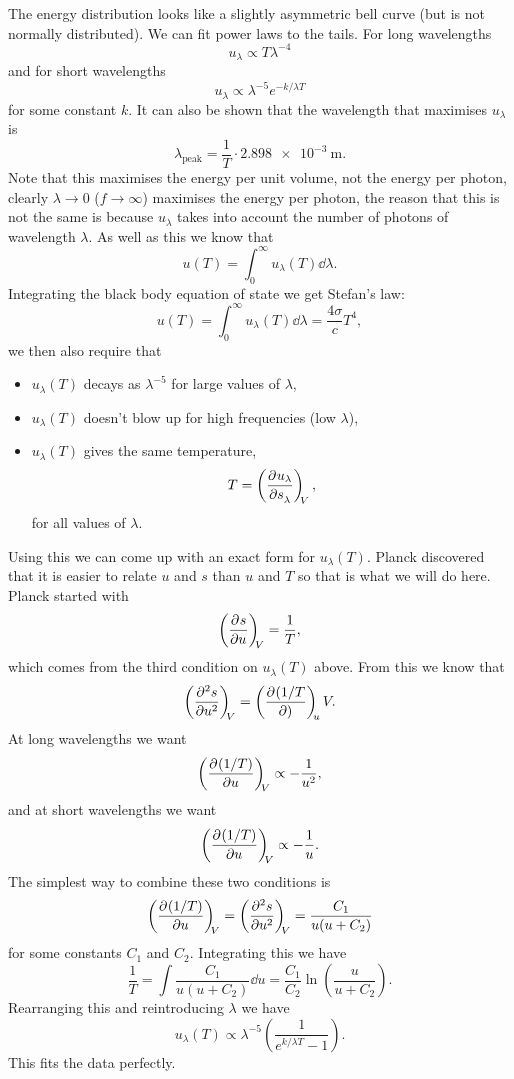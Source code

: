     The energy distribution looks like a slightly asymmetric bell curve (but is not normally distributed).
    We can fit power laws to the tails.
    For long wavelengths
    \[u_\lambda \propto T\lambda^{-4}\]
    and for short wavelengths
    \[u_\lambda \propto \lambda^{-5}e^{-k/\lambda T}\]
    for some constant \(k\).
    It can also be shown that the wavelength that maximises \(u_{\lambda}\) is
    \[\lambda_{\text{peak}} = \frac{1}{T}\cdot\SI{2.898e-3}{\meter}.\]
    Note that this maximises the energy per unit volume, not the energy per photon, clearly \(\lambda \to 0\) (\(f \to\infty\)) maximises the energy per photon, the reason that this is not the same is because \(u_{\lambda}\) takes into account the number of photons of wavelength \(\lambda\).
    As well as this we know that
    \[u(T) = \int_{0}^{\infty} u_{\lambda}(T) \dd{\lambda}.\]
    Integrating the black body equation of state we get Stefan's law:
    \[u(T) = \int_{0}^{\infty} u_{\lambda}(T)\dd{\lambda} = \frac{4\sigma}{c}T^4,\]
    we then also require that
    \begin{itemize}
        \item \(u_{\lambda}(T)\) decays as \(\lambda^{-5}\) for large values of \(\lambda\),
        \item \(u_{\lambda}(T)\) doesn't blow up for high frequencies (low \(\lambda\)),
        \item \(u_{\lambda}(T)\) gives the same temperature,
        \[T = \left(\pdv[]{u_{\lambda}}{s_{\lambda}}\right)_{\!\!{V}},\]
        for all values of \(\lambda\).
    \end{itemize}
    Using this we can come up with an exact form for \(u_{\lambda}(T)\).
    Planck discovered that it is easier to relate \(u\) and \(s\) than \(u\) and \(T\) so that is what we will do here.
    Planck started with
    \[\left(\pdv[]{s}{u}\right)_{\!\!{V}} = \frac{1}{T},\]
    which comes from the third condition on \(u_{\lambda}(T)\) above.
    From this we know that
    \[\left(\pdv[2]{s}{u}\right)_{\!\!{V}} = \left(\pdv[]{(1/T}{)}\right)_{\!\!{u}}{V}.\]
    At long wavelengths we want
    \[\left(\pdv[]{(1/T)}{u}\right)_{\!\!{V}} \propto -\frac{1}{u^2},\]
    and at short wavelengths we want
    \[\left(\pdv[]{(1/T)}{u}\right)_{\!\!{V}} \propto -\frac{1}{u}.\]
    The simplest way to combine these two conditions is
    \[\left(\pdv[]{(1/T)}{u}\right)_{\!\!{V}} = \left(\pdv[2]{s}{u}\right)_{\!\!{V}} = \frac{C_1}{u(u + C_2)}\]
    for some constants \(C_1\) and \(C_2\).
    Integrating this we have
    \[\frac{1}{T} = \int \frac{C_1}{u(u + C_2)}\dd{u} = \frac{C_1}{C_2}\ln\left(\frac{u}{u + C_2}\right).\]
    Rearranging this and reintroducing \(\lambda\) we have
    \[u_{\lambda}(T) \propto \lambda^{-5}\left(\frac{1}{e^{k/\lambda T} - 1}\right).\]
    This fits the data perfectly.
    
